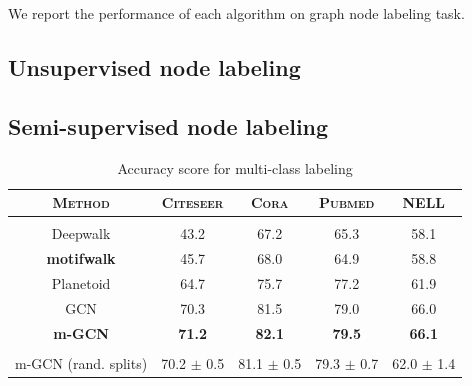 \documentclass{article}
\theoremstyle{definition}
\begin{document}
We report the performance of each algorithm on graph node
labeling task.

\subsection{Unsupervised node labeling}

\begin{table}[H]
\centering
{}
\caption{F1-macro score for multiclass labeling}
\label{t:re}
\end{table}

\subsection{Semi-supervised node labeling}

\begin{table}
\centering
\begin{tabular}{c | c c c c}
\textbf{\textsc{Method}} & \textsc{Citeseer} & \textsc{Cora} & \textsc{Pubmed} & \textsc{NELL} \\
\hline \\
Deepwalk & 43.2 & 67.2 & 65.3 & 58.1 \\
\textbf{motifwalk} & 45.7 & 68.0 & 64.9 & 58.8 \\
Planetoid & 64.7 & 75.7 & 77.2 & 61.9 \\
GCN & 70.3 & 81.5 & 79.0 & 66.0 \\
\textbf{m-GCN} & \textbf{71.2} & \textbf{82.1} & \textbf{79.5} & \textbf{66.1} \\
\hline \\
m-GCN (rand. splits) & 70.2 $\pm$ 0.5 & 81.1 $\pm$ 0.5 & 79.3 $\pm$ 0.7 & 62.0 $\pm$ 1.4 \\
\end{tabular}%
\caption{Accuracy score for multi-class labeling}
\label{t:re}
\end{table}
\end{document}
